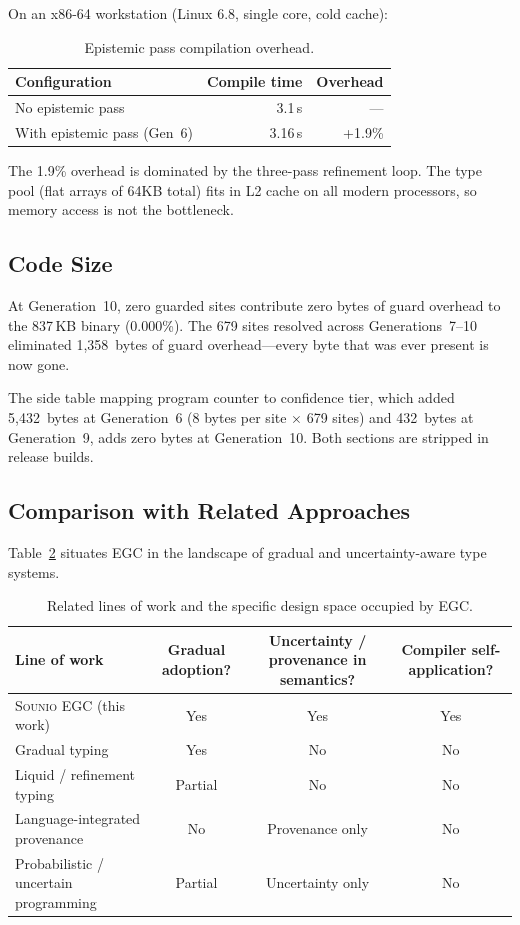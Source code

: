 \documentclass[acmsmall,screen,review,anonymous]{acmart}
\newcommand{\sounio}{\textsc{Sounio}\xspace}
\begin{document}
On an x86-64 workstation (Linux 6.8, single core, cold cache):

\begin{table}[h]
\centering
\small
\begin{tabular}{@{}lrr@{}}
\toprule
Configuration & Compile time & Overhead \\
\midrule
No epistemic pass & 3.1\,s & --- \\
With epistemic pass (Gen~6) & 3.16\,s & +1.9\% \\
\bottomrule
\end{tabular}
\caption{Epistemic pass compilation overhead.}
\label{tab:overhead}
\end{table}

The 1.9\% overhead is dominated by the three-pass refinement loop.
The type pool (flat arrays of 64KB total) fits in L2 cache on all
modern processors, so memory access is not the bottleneck.

\subsection{Code Size}

At Generation~10, zero guarded sites contribute zero bytes of guard overhead
to the 837\,KB binary (0.000\%).
The 679 sites resolved across Generations~7--10 eliminated 1,358~bytes of
guard overhead---every byte that was ever present is now gone.

The side table mapping program counter to confidence tier, which added
5,432~bytes at Generation~6 (8 bytes per site $\times$ 679 sites) and
432~bytes at Generation~9, adds zero bytes at Generation~10.
Both sections are stripped in release builds.

\subsection{Comparison with Related Approaches}

Table~\ref{tab:comparison} situates EGC in the landscape of gradual
and uncertainty-aware type systems.

\begin{table}[t]
\centering
\caption{%
  Related lines of work and the specific design space occupied by EGC.
}
\label{tab:comparison}
\begin{tabular}{@{}lccc@{}}
\toprule
Line of work & Gradual adoption? & Uncertainty / provenance in semantics? & Compiler self-application? \\
\midrule
\sounio EGC (this work) & Yes & Yes & Yes \\
Gradual typing~\cite{siek2006gradual,siek2021parameterized,ye2024tdos} & Yes & No & No \\
Liquid / refinement typing~\cite{rondon2008liquid} & Partial & No & No \\
Language-integrated provenance~\cite{fehrenbach2018lip} & No & Provenance only & No \\
Probabilistic / uncertain programming~\cite{bornholt2014uncertain,vandemeent2021pp} & Partial & Uncertainty only & No \\
\bottomrule
\end{tabular}
\end{table}
\end{document}
